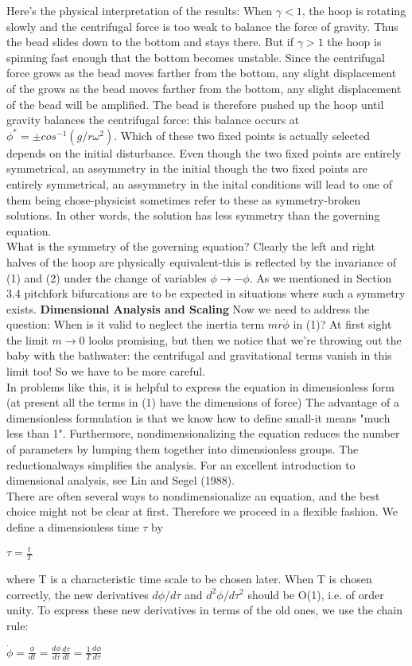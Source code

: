 \documentclass{article}
\newcommand\tab[1][1cm]{\hspace*{#1}}
\begin{document}
\tab Here's the physical interpretation of the results: When $\gamma < 1$, the hoop is rotating slowly and the centrifugal force is too weak to balance the force of gravity. Thus the bead slides down to the bottom and stays there. But if $\gamma > 1$ the hoop is spinning fast enough that the bottom becomes unstable. Since the centrifugal force grows as the bead moves farther from the bottom, any slight displacement of the grows as the bead moves farther from the bottom, any slight displacement of the bead will be amplified. The bead is therefore pushed up the hoop until gravity balances the centrifugal force: this balance occurs at $\phi^{*}=\pm cos^{-1}(g/r\omega^{2})$. Which of these two fixed points is actually selected depends on the initial disturbance. Even though the two fixed points are entirely symmetrical, an assymmetry in the initial though the two fixed points are entirely symmetrical, an assymmetry in the inital conditions will lead to one of them being chose-physicist sometimes refer to these as symmetry-broken solutions. In other words, the solution has less symmetry than the governing equation. \\
\tab What is the symmetry of the governing equation? Clearly the left and right halves of the hoop are physically equivalent-this is reflected by the invariance of (1) and (2) under the change of variables $\phi \to -\phi$. As we mentioned in Section 3.4 pitchfork bifurcations are to be expected in situations where such a symmetry exists.
\textbf {Dimensional Analysis and Scaling}
\tab Now we need to address the question: When is it valid to neglect the inertia term $mr\ddot{\phi}$ in (1)? At first sight the limit $m \to 0$ looks promising, but then we notice that we're throwing out the baby with the bathwater: the centrifugal and gravitational terms vanish in this limit too! So we have to be more careful. \\
\tab In problems like this, it is helpful to express the equation in dimensionless form (at present all the terms in (1) have the dimensions of force) The advantage of a dimensionless formulation is that we know how to define small-it means "much less than 1". Furthermore, nondimensionalizing the equation reduces the number of parameters by lumping them together into dimensionless groups. The reductionalways simplifies the analysis. For an excellent introduction to dimensional analysis, see Lin and Segel (1988). \\
\tab There are often several ways to nondimensionalize an equation, and the best choice might not be clear at first. Therefore we proceed in a flexible fashion. We define a dimensionless time $\tau$ by 
\begin{center}
$\tau = \frac{t}{T}$
\end{center}
where T is a characteristic time scale to be chosen later. When T is chosen correctly, the new derivatives $d\phi/d\tau$ and $d^{2}\phi/d\tau^{2}$ should be O(1), i.e. of order unity. To express these new derivatives in terms of the old ones, we use the chain rule:
\begin{center}
$\dot{\phi}=\frac{\phi}{dt}=\frac{d \phi}{d\tau}\frac{d\tau}{dt}=\frac{1}{T} \frac{d\phi}{d \tau}$
\end{center}
\end{document}
